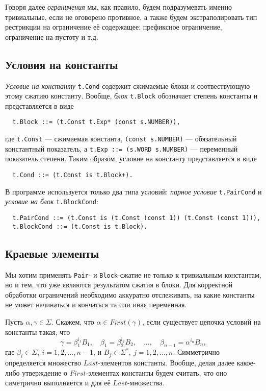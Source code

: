 \documentclass[12pt]{article}
\begin{document}
Говоря далее \textit{ограничения} мы, как правило, будем подразумевать именно
тривиальные, если не оговорено противное, а также будем экстраполировать
тип рестрикции на ограничение её содержащее: префиксное ограничение,
ограничение на пустоту и т.д.


\subsection{Условия на константы}

\textit{Условие на константу} \texttt{t.Cond} содержит сжимаемые блоки и
соотвествующую этому сжатию константу. Вообще, \textit{блок} \texttt{t.Block}
обозначает степень константы и представляется в виде
\begin{Verbatim}
  t.Block ::= (t.Const t.Exp* (const s.NUMBER)),
\end{Verbatim}
где \texttt{t.Const} --- сжимаемая константа, \texttt{(const s.NUMBER)} ---
обязательный константный показатель, а \texttt{t.Exp ::= (s.WORD s.NUMBER)}
--- переменный показатель степени. Таким образом, условие на константу
представляется в виде
\begin{Verbatim}
  t.Cond ::= (t.Const is t.Block+).
\end{Verbatim}
В программе используется только два типа условий: \textit{парное условие}
\texttt{t.PairCond} и \textit{условие на блок} \texttt{t.BlockCond}:
\begin{Verbatim}
  t.PairCond ::= (t.Const is (t.Const (const 1)) (t.Const (const 1))),
  t.BlockCond ::= (t.Const is t.Block).
\end{Verbatim}


\subsection{Краевые элементы} \label{bound-elements}

Мы хотим применять \texttt{Pair}- и \texttt{Block}-сжатие не только к
тривиальным константам, но и тем, что уже являются результатом сжатия в блоки.
Для корректной обработки ограничений необходимо аккуратно отслеживать, на какие
константы не может начинаться и кончаться та или иная переменная.

Пусть $\alpha, \gamma \in \Sigma$. Скажем, что $\alpha \in First(\gamma)$, если
существует цепочка условий на константы такая, что
\begin{displaymath}
  \gamma = \beta_1^{i_1} B_1,\quad
  \beta_1 = \beta_2^{i_2} B_2,\quad
  \dots,\quad
  \beta_{n-1} = \alpha^{i_n} B_n,
\end{displaymath}
где $\beta_i \in \Sigma, \ i = 1, 2, \dots, n - 1$, и $B_j \in \Sigma^*,
\ j = 1, 2, \dots, n$. Симметрично определяется множество $Last$-элементов
константы. Вообще, делая далее какое-либо утверждение о $First$-элементах
константы будем считать, что оно симетрично выполняется и для её
$Last$-множества.
\end{document}
